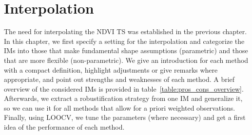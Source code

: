 \newcommand{\RobItPlot}{fitted to different (SCL45) NDVI {TS}. Iterations of a robustifying refit (as indicated in section~\ref{sec:loess_robustify}) are also displayed.}


\chapter{Interpolation} \label{sec:itpl}
	{%
		The need for interpolating the NDVI {TS} was established in the previous chapter. In this chapter, we first specify a setting for the interpolation and categorize the {{IM}}s into those that make fundamental shape assumptions (parametric) and those that are more flexible (non-parametric). We give an introduction for each method with a compact definition, highlight adjustments or give remarks where appropriate, and point out strengths and weaknesses of each method. A brief overview of the considered {{IM}}s is provided in table~\ref{table:pros_cons_overview}.
		Afterwards, we extract a robustification strategy from one {{IM}} and generalize it, so we can use it for all methods that allow for a priori weighted observations. Finally, using LOOCV, we tune the parameters (where necessary) and get a first idea of the performance of each method.


	}
	{%
		\footnotesize
		
		\normalsize
	}



